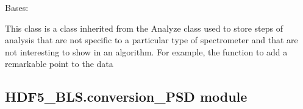 \documentclass[letterpaper,10pt,english]{sphinxmanual}
\begin{document}

\begin{fulllineitems}
\label{\detokenize{source/HDF5_BLS:HDF5_BLS.analyze.Analyze_general}}
\pysigstartsignatures
\pysiglinewithargsret
{}
{\sphinxparamcomma {}}
{}
\pysigstopsignatures
\sphinxAtStartPar
Bases: {\hyperref[\detokenize{source/HDF5_BLS:HDF5_BLS.analyze.Analyze}]{}}

\sphinxAtStartPar
This class is a class inherited from the Analyze class used to store steps of analysis that are not specific to a particular type of spectrometer and that are not interesting to show in an algorithm. For example, the function to add a remarkable point to the data

\end{fulllineitems}



\subsection{HDF5\_BLS.conversion\_PSD module}
\label{\detokenize{source/HDF5_BLS:module-HDF5_BLS.conversion_PSD}}\label{\detokenize{source/HDF5_BLS:hdf5-bls-conversion-psd-module}}
\end{document}
